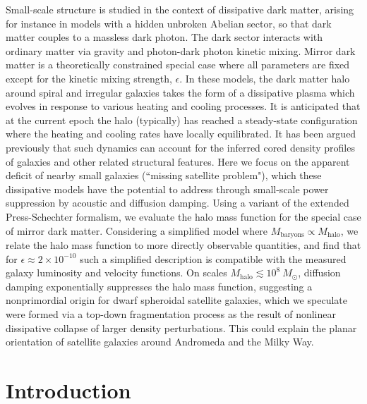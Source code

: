 \documentclass[12pt]{article}
\begin{document}
\begin{titlepage}
Small-scale structure is studied in the context of dissipative dark matter, arising for instance in models with a 
hidden unbroken Abelian sector, so that dark matter couples to a massless dark photon. The 
dark sector interacts with ordinary matter via gravity and photon-dark photon
kinetic mixing. Mirror dark matter is a  theoretically constrained special case where all parameters are fixed except for the kinetic mixing strength,
$\epsilon$. In these models, the dark matter halo around spiral and irregular galaxies takes the form of a dissipative 
plasma which evolves in response to various heating and cooling processes.
It is anticipated that at the current epoch the halo (typically) has reached a steady-state configuration
where the heating and cooling rates have locally equilibrated.
It has been argued previously that such dynamics can account for the inferred cored density profiles of galaxies and other related structural features. 
Here we focus on the apparent deficit of nearby small galaxies (``missing satellite problem"), which these dissipative models have
the potential to address through small-scale power suppression by acoustic and diffusion damping. Using a variant 
of the extended Press-Schechter formalism, we evaluate the halo mass function for the special case of mirror dark matter. 
Considering a simplified model where $M_{\text{baryons}} \propto M_{\text{halo}}$, we relate the halo mass function to more directly observable 
quantities, and find that for $\epsilon \approx 2 \times 10^{-10}$ such a simplified description is compatible with the measured 
galaxy luminosity and velocity functions. 
On scales $M_{\text{halo}} \lesssim 10^8 \ M_\odot$, diffusion damping exponentially suppresses the halo mass function, 
suggesting a nonprimordial origin for 
dwarf spheroidal satellite galaxies, which we speculate were formed via a top-down fragmentation process as the result 
of nonlinear dissipative collapse of larger density perturbations. This could explain the planar 
orientation of satellite galaxies around Andromeda and the Milky Way.

\end{titlepage}
 
\newpage

\section{Introduction}
\label{introduction}
\end{document}
